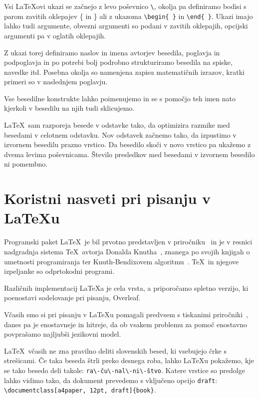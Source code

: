 \documentclass[a4paper,12pt,openright]{book}
\begin{document}
Vsi \LaTeX ovi ukazi se začnejo z levo poševnico \texttt{\textbackslash}, okolja pa definiramo bodisi s parom zavitih oklepajev \{ in \} ali z ukazoma \texttt{\textbackslash begin\{ \}} in \texttt{\textbackslash end\{ \}}.
Ukazi imajo lahko tudi argumente, obvezni argumenti so podani v zavitih oklepajih, opcijski argumenti pa v oglatih oklepajih.

Z ukazi torej definiramo naslov in imena avtorjev besedila, poglavja in podpoglavja in po potrebi bolj podrobno strukturiramo besedila na spiske, navedke itd.
Posebna okolja so namenjena zapisu matematičnih izrazov, kratki primeri so v naslednjem poglavju.

Vse besedilne konstrukte lahko poimenujemo in se s pomočjo teh imen nato  kjerkoli v besedilu na njih  tudi sklicujemo.

\LaTeX\ sam razporeja besede v odstavke tako, da optimizira razmike med besedami v celotnem odstavku.
Nov odstavek začnemo tako, da izpustimo v izvornem besedilu prazno vrstico. Da besedilo skoči v novo vrstico pa ukažemo z dvema levima poševnicama.
Število presledkov med besedami v izvornem besedilo ni pomembno.

\section{Koristni nasveti pri pisanju v \LaTeX{u}}

Programski paket \LaTeX\ je bil prvotno predstavljen v priročniku~\cite{lamport} in je v resnici nadgradnja sistema \TeX\ avtorja Donalda Knutha~\cite{knuth},
znanega po svojih knjigah o umetnosti programiranja
ter Knuth-Bendixovem algoritmu~\cite{knuth1983simple}.
\TeX\ in njegove izpeljanke so odprtokodni programi.

Različnih implementacij \LaTeX{}a je cela vrsta, a priporočamo 
spletno verzijo, ki poenostavi sodelovanje pri pisanju, Overleaf.

Včasih smo si pri pisanju v \LaTeX{}u  pomagali predvsem s tiskanimi pri\-ro\-čni\-ki~\cite{lamport}, danes pa je enostavneje in hitreje, da ob vsakem problemu za pomoč enostavno povprašamo najljubši jezikovni model.

\LaTeX\ včasih ne zna pravilno deliti slovenskih besed, ki vsebujejo črke s streši\-ca\-mi.
Če taka beseda štrli preko desnega roba,  lahko \LaTeX{}u pokažemo, kje se tako besedo deli takole: \verb=ra\-ču\-nal\-ni\-štvo=.
Katere vrstice so predolge lahko vidimo tako, da dokument prevedemo s vključeno opcijo \texttt{draft}: \verb=\documentclass[a4paper, 12pt, draft]{book}=.
\end{document}
